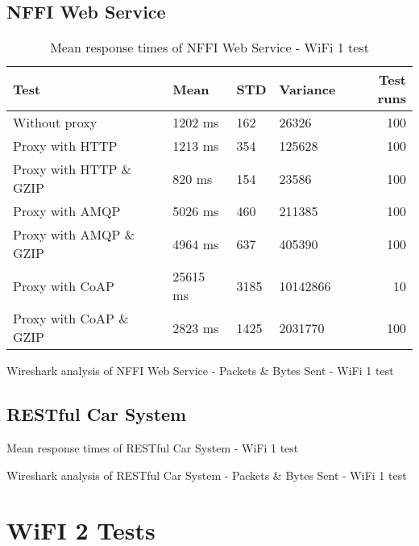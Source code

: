 \begin{appendices}
\subsection{NFFI Web Service}

\begin{table}[H]
\begin{tabular}{llllr}
\hline
 Test                   &   Mean &   STD &   Variance &   Test runs \\
\hline
  Without proxy & 1202 ms & 162 & 26326 & 100 \\
  Proxy with HTTP & 1213 ms & 354 & 125628 & 100 \\
  Proxy with HTTP \& GZIP & 820 ms & 154 & 23586 & 100 \\
  Proxy with AMQP & 5026 ms & 460 & 211385 & 100 \\
  Proxy with AMQP \& GZIP & 4964 ms & 637 & 405390 & 100\\
  Proxy with CoAP & 25615 ms & 3185 & 10142866 & 10 \\
  Proxy with CoAP \& GZIP & 2823 ms & 1425 & 2031770 & 100 \\
\end{tabular}
\caption{Mean response times of NFFI Web Service - WiFi 1 test}
\end{table}

\begin{table}[H]

\caption{Wireshark analysis of NFFI Web Service - Packets \& Bytes Sent - WiFi 1 test}
\end{table}

\subsection{RESTful Car System}

\begin{table}[H]

\caption{Mean response times of RESTful Car System - WiFi 1 test}
\end{table}

\begin{table}[H]

\caption{Wireshark analysis of RESTful Car System - Packets \& Bytes Sent - WiFi 1 test}
\end{table}


\section{WiFI 2 Tests}


\end{appendices}
